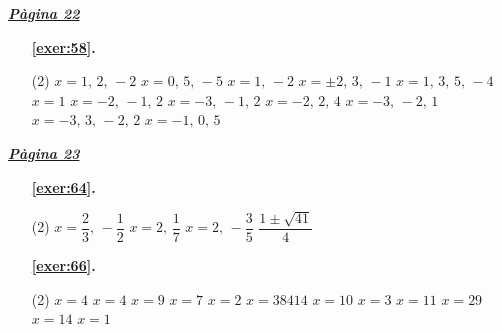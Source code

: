 
\hyperlink{page.22}{\textbf{\em Pàgina 22}}
\begin{enumerate}



 \item[\fontfamily{phv}\selectfont\color{blue}\textbf{\ref{exer:58}. }] \label{ans:58}
 \begin{tasks}[column-sep=1em, item-indent=1.3333em](2)
	 \task  $x=1,\,2,\,-2$
	 \task $x=0,\,5,\,-5$
	 \task $x=1,\,-2$
	 \task $x=\pm 2,\,3,\,-1$
	 \task $x=1,\,3,\,5,\,-4$
	 \task $x=1$
	 \task $x=-2,\,-1,\,2$
	 \task $x=-3,\,-1,\,2$
	 \task $x=-2,\,2,\,4$
	 \task $x=-3,\,-2,\,1$
	 \task $x=-3,\,3,\,-2,\,2$
	 \task $x=-1,\,0,\,5$ 
\end{tasks}
 \end{enumerate}
\vspace{0.3cm}


\hyperlink{page.23}{\textbf{\em Pàgina 23}}
\begin{enumerate}



 \item[\fontfamily{phv}\selectfont\color{blue}\textbf{\ref{exer:64}. }] \label{ans:64}
 \begin{tasks}[column-sep=1em, item-indent=1.3333em](2)
	 \task  $x= \dfrac {2}{3},\,-\dfrac {1}{2}$
	 \task $x=2,\,\dfrac {1}{7}$
	 \task $x=2,\,-\dfrac {3}{5}$
	 \task $\dfrac {1\pm \sqrt {41}}{4}$
\end{tasks}
 \end{enumerate}
\begin{enumerate}



 \item[\fontfamily{phv}\selectfont\color{blue}\textbf{\ref{exer:66}. }] \label{ans:66}
 \begin{tasks}[column-sep=1em, item-indent=1.3333em](2)
	 \task  $x=4$
	 \task $x=4$
	 \task $x=9$
	 \task $x=7$
	 \task $x=2$
	 \task $x=38414$
	 \task $x=10$
	 \task $x=3$
	 \task $x=11$
	 \task $x=29$
	 \task $x=14$
	 \task $x=1$
\end{tasks}
 \end{enumerate}
\vspace{0.3cm}


